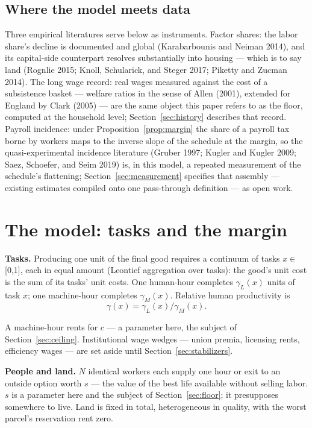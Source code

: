 \documentclass[12pt]{article}
\theoremstyle{plain}
\begin{document}
\subsection{Where the model meets data}\label{sec:data}

Three empirical literatures serve below as instruments. Factor shares: the labor share's decline is documented and global (Karabarbounis and Neiman 2014), and its capital-side counterpart resolves substantially into housing --- which is to say land (Rognlie 2015; Knoll, Schularick, and Steger 2017; Piketty and Zucman 2014). The long wage record: real wages measured against the cost of a subsistence basket --- welfare ratios in the sense of Allen (2001), extended for England by Clark (2005) --- are the same object this paper refers to as the floor, computed at the household level; Section~\ref{sec:history} describes that record. Payroll incidence: under Proposition~\ref{prop:margin} the share of a payroll tax borne by workers maps to the inverse slope of the schedule at the margin, so the quasi-experimental incidence literature (Gruber 1997; Kugler and Kugler 2009; Saez, Schoefer, and Seim 2019) is, in this model, a repeated measurement of the schedule's flattening; Section~\ref{sec:measurement} specifies that assembly --- existing estimates compiled onto one pass-through definition --- as open work.

\section{The model: tasks and the margin}\label{sec:model}

\textbf{Tasks.} Producing one unit of the final good requires a continuum of tasks $x \in$ [0,1], each in equal amount (Leontief aggregation over tasks): the good's unit cost is the sum of its tasks' unit costs. One human-hour completes $\gamma _L(x)$ units of task $x$; one machine-hour completes $\gamma _M(x)$. Relative human productivity is
\begin{equation}\label{eq:gamma}
\gamma (x) = \gamma _L(x) / \gamma _M(x).
\end{equation}

A machine-hour rents for $c$ --- a parameter here, the subject of Section~\ref{sec:ceiling}. Institutional wage wedges --- union premia, licensing rents, efficiency wages --- are set aside until Section~\ref{sec:stabilizers}.

\textbf{People and land.} $N$ identical workers each supply one hour or exit to an outside option worth $s$ --- the value of the best life available without selling labor. $s$ is a parameter here and the subject of Section~\ref{sec:floor}; it presupposes somewhere to live. Land is fixed in total, heterogeneous in quality, with the worst parcel's reservation rent zero.
\end{document}
